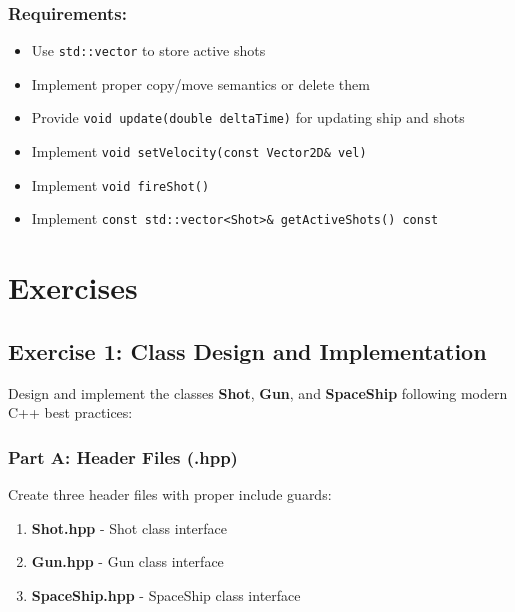 \documentclass[
]{article}
\providecommand{\tightlist}{%
  \setlength{\itemsep}{0pt}\setlength{\parskip}{0pt}}
\begin{document}
\subsubsection{Requirements:}\label{requirements-2}

\begin{itemize}
\tightlist
\item
  Use \texttt{std::vector} to store active shots
\item
  Implement proper copy/move semantics or delete them
\item
  Provide \texttt{void\ update(double\ deltaTime)} for updating ship and
  shots
\item
  Implement \texttt{void\ setVelocity(const\ Vector2D\&\ vel)}
\item
  Implement \texttt{void\ fireShot()}
\item
  Implement
  \texttt{const\ std::vector\textless{}Shot\textgreater{}\&\ getActiveShots()\ const}
\end{itemize}

\section{Exercises}\label{exercises}

\subsection{Exercise 1: Class Design and
Implementation}\label{exercise-1-class-design-and-implementation}

Design and implement the classes \textbf{Shot}, \textbf{Gun}, and
\textbf{SpaceShip} following modern C++ best practices:

\subsubsection{Part A: Header Files
(.hpp)}\label{part-a-header-files-.hpp}

Create three header files with proper include guards:

\begin{enumerate}
\def\labelenumi{\arabic{enumi}.}
\tightlist
\item
  \textbf{Shot.hpp} - Shot class interface
\item
  \textbf{Gun.hpp} - Gun class interface
\item
  \textbf{SpaceShip.hpp} - SpaceShip class interface
\end{enumerate}
\end{document}
